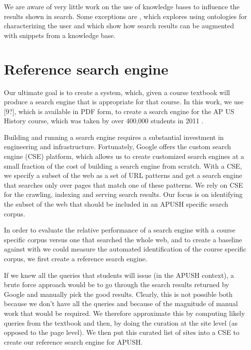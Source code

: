 \documentclass[pdfpagelabels=false,plainpages=true]{acm_proc_article-sp}
\begin{document}
We are aware of very little work on the use of knowledge bases to influence the
results shown in search. Some exceptions are \cite{jiang2009learning}, which explores
using ontologies for characterizing the user and \cite{guha2003semantic} which
show how search results can be augmented with snippets from a knowledge base.   

\section{Reference search engine}

Our ultimate goal is to create a system, which, given a course textbook will
produce a search engine that is appropriate for that course. In this work, we
use [9?], which is available in PDF form, to create a search engine for the AP US
History course, which was taken by over 400,000 students in 2011 \cite{wikipedia}. 

Building and running a search engine requires a substantial investment in
engineering and infrastructure. Fortunately, Google offers the custom search
engine (CSE) platform, which allows us to create customized search engines at a
small fraction of the cost of building a search engine from scratch. With a CSE,
we specify a subset of the web as a set of URL patterns and get a search engine
that searches only over pages that match one of these patterns. We rely on CSE
for the crawling, indexing and serving search results. Our focus is on
identifying the subset of the web that should be included in an APUSH specific
search corpus. 

In order to evaluate the relative performance of a search engine with a course
specific corpus versus one that searched the whole web, and to create a baseline
against with we could measure the automated identification of the course
specific corpus, we first create a reference search engine. 

If we knew all the queries that students will issue (in the APUSH context), a
brute force approach would be to go through the search results returned by
Google and manually pick the good results. Clearly, this is not possible both
because we don't have all the queries and because of the magnitude of manual
work that would be required. We therefore approximate this by computing likely
queries from the textbook and then, by doing the curation at the site level (as
opposed to the page level). We then put this curated list of sites into a CSE to
create our reference search engine for APUSH. 
\end{document}
